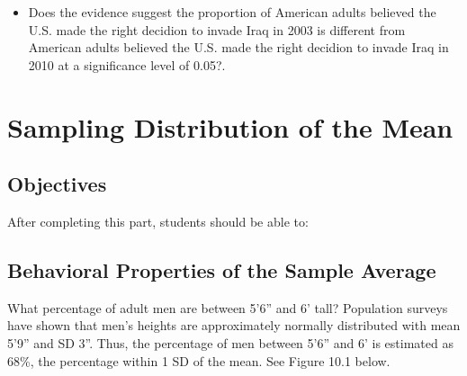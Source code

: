 \documentclass[11pt, chapterprefix=true]{scrbook}\usepackage[]{graphicx}\usepackage[]{color}
\begin{document}
\begin{exercises}
\begin{exercise}
\begin{itemize}
 \item Does the evidence suggest the proportion of American adults believed the \\ U.S. made the right decidion to invade Iraq in 2003 is different from American adults believed the  U.S. made the right decidion to invade Iraq in 2010 at a significance level of 0.05?.  
\end{itemize}

\end{exercise}
\begin{solution}  %

\end{solution}
\end{exercises}

\onecolumn



\chapter{Sampling Distribution of the Mean}
\label{chap:ch11}

\section{Objectives}

After completing this part, students should be able to:


\section{Behavioral Properties of the Sample Average}

What percentage of adult men are between 5'6'' and 6' tall?  Population surveys have shown that men's heights are approximately normally distributed with mean 5'9'' and SD 3''.  Thus, the percentage of men between 5'6'' and 6' is estimated as 68\%, the percentage within 1 SD of the mean.  See Figure 10.1 below.
\end{document}
